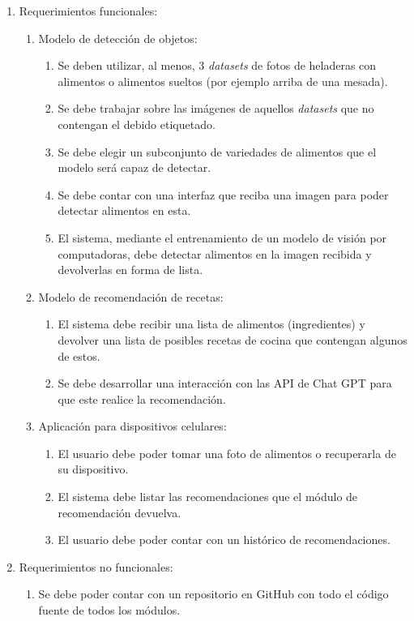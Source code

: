 \documentclass[
11pt, %
]{charter}
\begin{document}
\begin{enumerate}
	\item Requerimientos funcionales:
		\begin{enumerate}
			\item Modelo de detección de objetos:
			\begin{enumerate}
				\item Se deben utilizar, al menos, 3 \textit{datasets} de fotos de heladeras con alimentos o alimentos sueltos (por ejemplo arriba de una mesada).
				\item Se debe trabajar sobre las imágenes de aquellos \textit{datasets} que no contengan el debido etiquetado.
				\item Se debe elegir un subconjunto de variedades de alimentos que el modelo será capaz de detectar.
				\item Se debe contar con una interfaz que reciba una imagen para poder detectar alimentos en esta.
				\item El sistema, mediante el entrenamiento de un modelo de visión por computadoras, debe detectar alimentos en la imagen recibida y devolverlas en forma de lista.
			\end{enumerate}
			\item Modelo de recomendación de recetas:
			\begin{enumerate}
				\item El sistema debe recibir una lista de alimentos (ingredientes) y devolver una lista de posibles recetas de cocina que contengan algunos de estos.
				\item Se debe desarrollar una interacción con las API de Chat GPT para que este realice la recomendación.
			\end{enumerate}
			\item Aplicación para dispositivos celulares:
			\begin{enumerate}
				\item El usuario debe poder tomar una foto de alimentos o recuperarla de su dispositivo.
				\item El sistema debe listar las recomendaciones que el módulo de recomendación devuelva.
				\item El usuario debe poder contar con un histórico de recomendaciones.
			\end{enumerate}
		\end{enumerate}
	\item Requerimientos no funcionales:
		\begin{enumerate}
			\item Se debe poder contar con un repositorio en GitHub con todo el código fuente de todos los módulos.

\end{enumerate}
\end{enumerate}
\end{document}
